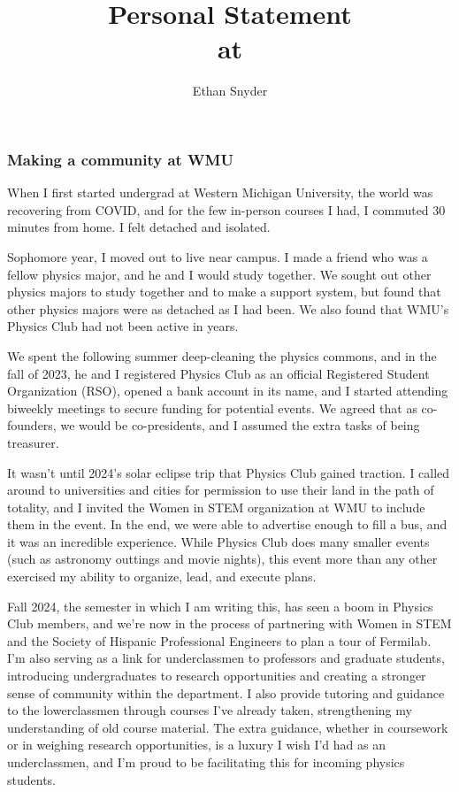 \documentclass[11pt]{article}
\title{\vspace{-5em}Personal Statement\\
	\large \dept{} at \school{}}
\author{Ethan Snyder}
\date{}
\begin{document}
\maketitle
\subsubsection*{Making a community at WMU}
When I first started undergrad at Western Michigan University, the world was recovering from COVID, and for the few in-person courses I had, I commuted 30 minutes from home. I felt detached and isolated.

Sophomore year, I moved out to live near campus. I made a friend who was a fellow physics major, and he and I would study together. We sought out other physics majors to study together and to make a support system, but found that other physics majors were as detached as I had been. We also found that WMU's Physics Club had not been active in years.

We spent the following summer deep-cleaning the physics commons, and in the fall of 2023, he and I registered Physics Club as an official Registered Student Organization (RSO), opened a bank account in its name, and I started attending biweekly meetings to secure funding for potential events. We agreed that as co-founders, we would be co-presidents, and I assumed the extra tasks of being treasurer.

It wasn't until 2024's solar eclipse trip that Physics Club gained traction. I called around to universities and cities for permission to use their land in the path of totality, and I invited the Women in STEM organization at WMU to include them in the event. In the end, we were able to advertise enough to fill a bus, and it was an incredible experience. While Physics Club does many smaller events (such as astronomy outtings and movie nights), this event more than any other exercised my ability to organize, lead, and execute plans.

Fall 2024, the semester in which I am writing this, has seen a boom in Physics Club members, and we're now in the process of partnering with Women in STEM and the Society of Hispanic Professional Engineers to plan a tour of Fermilab. I'm also serving as a link for underclassmen to professors and graduate students, introducing undergraduates to research opportunities and creating a stronger sense of community within the department. I also provide tutoring and guidance to the lowerclassmen through courses I've already taken, strengthening my understanding of old course material. The extra guidance, whether in coursework or in weighing research opportunities, is a luxury I wish I'd had as an underclassmen, and I'm proud to be facilitating this for incoming physics students.
\end{document}
